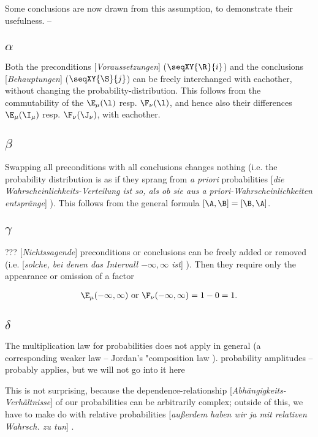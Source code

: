 \documentclass{article}
\newcommand{\WTF}[1]{
[\it{\small{#1}}]
}
\newcommand{\uequ}[1]{
\begin{align*}
#1
\end{align*}
}
\renewcommand{\it}[1]{\textit{#1}}
\begin{document}
Some conclusions are now drawn from this assumption, to demonstrate their usefulness. --

\subsection*{$\alpha$}
Both the preconditions\WTF{Voraussetzungen} ($\seqXY{\R}{i}$) and the conclusions\WTF{Behauptungen} ($\seqXY{\S}{j}$) can be freely interchanged with eachother, without changing the probability-distribution. This follows from the commutability of the $\E_\mu(\l)$ resp. $\F_\nu(\l)$, and hence also their differences $\E_\mu(\I_\mu)$ resp. $\F_\nu(\J_\nu)$, with eachother.

\subsection*{$\beta$}
Swapping all preconditions with all conclusions changes nothing (i.e. the probability distribution is as if they sprang from \it{a priori} probabilities\WTF{die Wahrscheinlichkeits-Verteilung ist so, als ob sie aus a priori-Wahrscheinlichkeiten entspränge}). This follows from the general formula $[\A,\B]=[\B,\A]$.

\subsection*{$\gamma$}
???\WTF{Nichtssagende} preconditions or conclusions can be freely added or removed (i.e. \WTF{solche, bei denen das Intervall $-\infty,\infty$ ist}). Then they require only the appearance or omission of a factor
\uequ{
\E_\mu(-\infty,\infty)\text{ or }\F_\nu(-\infty,\infty) = 1-0=1.
}

\subsection*{$\delta$}
The multiplication law for probabilities does not apply in general (a corresponding weaker law -- Jordan's "composition law ).
probability amplitudes -- probably applies, but we will not go into it here

 This is not surprising, because the dependence-relationship\WTF{Abhängigkeits-Verhältnisse} of our probabilities can be arbitrarily complex; outside of this, we have to make do with relative probabilities\WTF{außerdem haben wir ja mit relativen Wahrsch. zu tun}.
 
\end{document}
